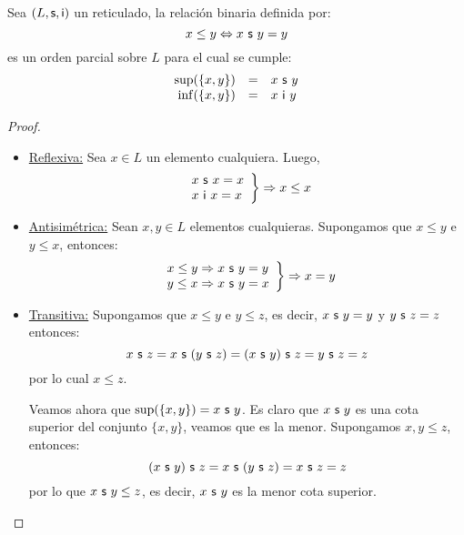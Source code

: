   \begin{theorem} \label{theorem_4}
    \PN Sea $(L, \mathsf{s}, \mathsf{i})$ un reticulado, la relación binaria definida por:
    \[
      x \leq y \Leftrightarrow x \ \SU \ y = y
    \]
    \PN es un orden parcial sobre $L$ para el cual se cumple:
    \[
      \begin{array}{rcl}
        \sup (\{x, y\}) &=& x \ \mathsf{s} \ y \\
        \inf (\{x, y\}) &=& x \ \mathsf{i} \ y
      \end{array}
    \]
  \end{theorem}
  \begin{proof}
    \PN \newline
    \begin{itemize}
      \item \underline{Reflexiva:} Sea $x \in L$ un elemento cualquiera. Luego,
        \begin{equation*}
          \left.
          \begin{array}{l}
            x \ \mathsf{s} \ x = x \\
            x \ \mathsf{i} \ x = x
          \end{array}
          \right \rbrace \Rightarrow x \leq x
        \end{equation*}

      \item \underline{Antisimétrica:} Sean $x, y \in L$ elementos cualquieras. Supongamos que $x \leq y$ e $y \leq x$,
        entonces:
        \begin{equation*}
          \left.
          \begin{array}{l}
            x \leq y \Rightarrow x \ \mathsf{s} \ y = y \\
            y \leq x \Rightarrow x \ \mathsf{s} \ y = x
          \end{array}
          \right \rbrace \Rightarrow x = y
        \end{equation*}

      \item \underline{Transitiva:} Supongamos que $x \leq y$ e $y \leq z$, es decir, $x \ \mathsf{s} \ y = y$ y $y \ \mathsf{s} \ z =
      z$ entonces:
        \[
          x \ \SU \ z = x \ \SU \ (y \ \SU \ z) = (x \ \SU \ y) \ \SU \ z = y \ \SU \ z = z
        \]
        \PN por lo cual $x \leq z$.

        \PN Veamos ahora que $\sup(\{x, y\}) = x \ \mathsf{s} \ y$. Es claro que $x \ \mathsf{s} \ y$ es una cota superior del
        conjunto $\{x, y\}$, veamos que es la menor. Supongamos $x, y \leq z$, entonces:
        \[
          (x \ \mathsf{s} \ y) \ \mathsf{s} \ z = x \ \mathsf{s} \ (y \ \mathsf{s} \ z) = x \ \mathsf{s} \ z = z
        \]
        \PN por lo que $x\ \mathsf{s} \ y \leq z$, es decir, $x\ \mathsf{s} \ y$ es la menor cota superior.


\end{itemize}
\end{proof}
